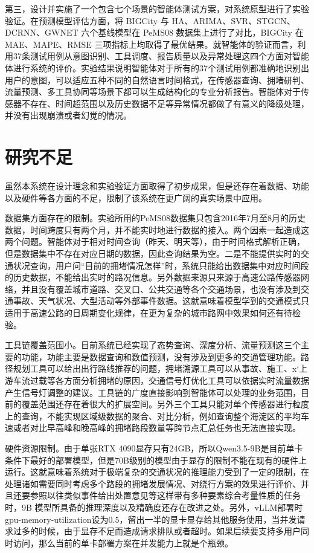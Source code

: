 第三，设计并实施了一个包含七个场景的智能体测试方案，对系统原型进行了实验验证。在预测模型评估方面，将 BIGCity 与 HA、ARIMA、SVR、STGCN、DCRNN、GWNET 六个基线模型在 PeMS08 数据集上进行了对比，BIGCity 在 MAE、MAPE、RMSE 三项指标上均取得了最优结果。就智能体的验证而言，利用37条测试用例从意图识别、工具调度、报告质量以及异常处理这四个方面对智能体进行系统的评价。实验结果说明智能体对于所有的37个测试用例都准确地识别出用户的意图，可以适应五种不同的自然语言时间格式，在传感器查询、拥堵研判、流量预测、多工具协同等场景下都可以生成结构化的专业分析报告。智能体对于传感器不存在、时间超范围以及历史数据不足等异常情况都做了有意义的降级处理，并没有出现崩溃或者幻觉的情况。


\section{研究不足}

虽然本系统在设计理念和实验验证方面取得了初步成果，但是还存在着数据、功能以及硬件等各方面的不足，限制了该系统在更广阔的真实场景中应用。

数据集方面存在的限制。实验所用的PeMS08数据集只包含2016年7月至8月的历史数据，时间跨度只有两个月，并不能实时地进行数据的接入。两个因素一起造成这两个问题。智能体对于相对时间查询（昨天、明天等），由于时间格式解析正确，但是数据集中不存在对应日期的数据，因此查询结果为空。二是不能提供实时的交通状况查询，用户问“目前的拥堵情况怎样”时，系统只能给出数据集中对应时间段的历史数据，不能给出实时的路况信息。另外数据来源只来源于高速公路传感器网络，并且没有覆盖城市道路、交叉口、公共交通等各个交通场景，也没有涉及到交通事故、天气状况、大型活动等外部事件数据。这就意味着模型学到的交通模式只适用于高速公路的日周期变化规律，在更为复杂的城市路网中效果如何还有待检验。

工具链覆盖范围小。目前系统已经实现了态势查询、深度分析、流量预测这三个主要的功能，功能主要是数据查询和数值预测，没有涉及到更多的交通管理功能。路径规划工具可以给出出行路线推荐的问题，拥堵溯源工具可以从事故、施工、x`上游车流过载等各方面分析拥堵的原因，交通信号灯优化工具可以依据实时流量数据产生信号灯调整的建议。工具链的广度直接影响到智能体可以处理的业务范围，目前的覆盖范围还存在着很大的扩展空间。另外三个工具只能对单个传感器进行粒度上的查询，不能实现区域级数据的聚合、对比分析，例如查询整个海淀区的平均车速或者对比早高峰和晚高峰的拥堵路段数量等跨节点汇总任务也无法直接实现。

硬件资源限制。由于单张RTX 4090显存只有24GB，所以Qwen3.5-9B是目前单卡条件下最好的部署模型，但是70B级别的模型由于显存的限制不能在现有的硬件上运行。这就意味着系统对于极端复杂的交通状况的推理能力受到了一定的限制，在处理诸如需要同时考虑多个路段的拥堵发展情况、对绕行方案的效果进行评价、并且还要参照以往类似事件给出处置意见等这样带有多种要素综合考量性质的任务时，9B 模型所具备的推理深度以及精确度还存在改进之处。另外，vLLM部署时gpu-memory-utilization设为0.5，留出一半的显卡显存给其他服务使用，当并发请求过多的时候，由于显存不足而造成请求排队或者超时。如果后续要支持多用户同时访问，那么当前的单卡部署方案在并发能力上就是个瓶颈。

